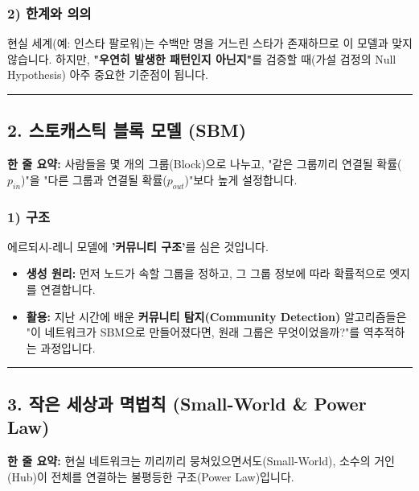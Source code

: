 \documentclass[11pt,a4paper]{book}
\theoremstyle{definition}
\begin{document}
\subsubsection*{2) 한계와 의의}
현실 세계(예: 인스타 팔로워)는 수백만 명을 거느린 스타가 존재하므로 이 모델과 맞지 않습니다. 하지만, \textbf{"우연히 발생한 패턴인지 아닌지"}를 검증할 때(가설 검정의 Null Hypothesis) 아주 중요한 기준점이 됩니다.

\vspace{0.5cm}\hrule\vspace{0.5cm}

\subsection{2. 스토캐스틱 블록 모델 (SBM)}


\begin{conceptbox}[title={개념 2: 유유상종의 수학화}]
\textbf{한 줄 요약:} 사람들을 몇 개의 그룹(Block)으로 나누고, "같은 그룹끼리 연결될 확률($p_{in}$)"을 "다른 그룹과 연결될 확률($p_{out}$)"보다 높게 설정합니다.
\end{conceptbox}

\subsubsection*{1) 구조}
에르되시-레니 모델에 \textbf{'커뮤니티 구조'}를 심은 것입니다.
\begin{itemize}
    \item \textbf{생성 원리:} 먼저 노드가 속할 그룹을 정하고, 그 그룹 정보에 따라 확률적으로 엣지를 연결합니다.
    \item \textbf{활용:} 지난 시간에 배운 \textbf{커뮤니티 탐지(Community Detection)} 알고리즘들은 "이 네트워크가 SBM으로 만들어졌다면, 원래 그룹은 무엇이었을까?"를 역추적하는 과정입니다.
\end{itemize}

\vspace{0.5cm}\hrule\vspace{0.5cm}

\subsection{3. 작은 세상과 멱법칙 (Small-World \& Power Law)}

\begin{conceptbox}[title={개념 3: 좁은 세상 속 거인들}]
\textbf{한 줄 요약:} 현실 네트워크는 끼리끼리 뭉쳐있으면서도(Small-World), 소수의 거인(Hub)이 전체를 연결하는 불평등한 구조(Power Law)입니다.
\end{conceptbox}
\end{document}
